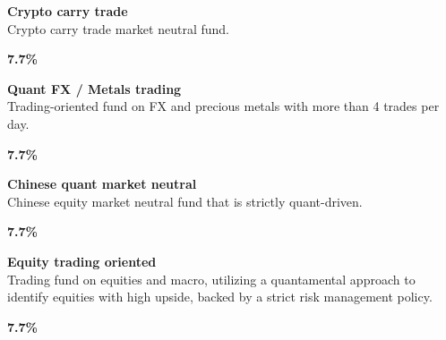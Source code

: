 \documentclass[11pt]{article}
\begin{document}
\begin{tcolorbox}[colback=cardbg, colframe=cardborder, boxrule=0.5pt, arc=4pt, left=6pt, right=6pt, top=6pt, bottom=6pt]
    \begin{minipage}[c]{0.82\linewidth}
        \textbf{\textcolor{primary}{Crypto carry trade}} \\[4pt]
        \textcolor{primary}{Crypto carry trade market neutral fund.}
    \end{minipage}%
    \hfill
    \begin{minipage}[c]{0.15\linewidth}
        \centering
        \textbf{\Large \textcolor{accent}{7.7\%}}
    \end{minipage}
\end{tcolorbox}

\begin{tcolorbox}[colback=cardbg, colframe=cardborder, boxrule=0.5pt, arc=4pt, left=6pt, right=6pt, top=6pt, bottom=6pt]
    \begin{minipage}[c]{0.82\linewidth}
        \textbf{\textcolor{primary}{Quant FX / Metals trading}} \\[4pt]
        \textcolor{primary}{Trading-oriented fund on FX and precious metals with more than 4 trades per day.}
    \end{minipage}%
    \hfill
    \begin{minipage}[c]{0.15\linewidth}
        \centering
        \textbf{\Large \textcolor{accent}{7.7\%}}
    \end{minipage}
\end{tcolorbox}

\begin{tcolorbox}[colback=cardbg, colframe=cardborder, boxrule=0.5pt, arc=4pt, left=6pt, right=6pt, top=6pt, bottom=6pt]
    \begin{minipage}[c]{0.82\linewidth}
        \textbf{\textcolor{primary}{Chinese quant market neutral}} \\[4pt]
        \textcolor{primary}{Chinese equity market neutral fund that is strictly quant-driven.}
    \end{minipage}%
    \hfill
    \begin{minipage}[c]{0.15\linewidth}
        \centering
        \textbf{\Large \textcolor{accent}{7.7\%}}
    \end{minipage}
\end{tcolorbox}

\begin{tcolorbox}[colback=cardbg, colframe=cardborder, boxrule=0.5pt, arc=4pt, left=6pt, right=6pt, top=6pt, bottom=6pt]
    \begin{minipage}[c]{0.82\linewidth}
        \textbf{\textcolor{primary}{Equity trading oriented}} \\[4pt]
        \textcolor{primary}{Trading fund on equities and macro, utilizing a quantamental approach to identify equities with high upside, backed by a strict risk management policy.}
    \end{minipage}%
    \hfill
    \begin{minipage}[c]{0.15\linewidth}
        \centering
        \textbf{\Large \textcolor{accent}{7.7\%}}
    \end{minipage}
\end{tcolorbox}
\end{document}
